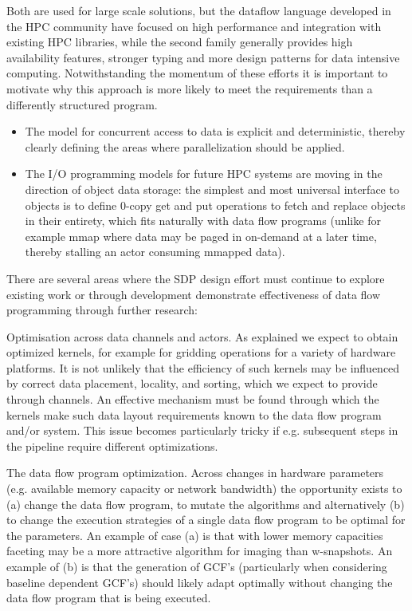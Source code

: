 \documentclass[11pt,a4paper]{article}
\begin{document}
Both are used for large scale solutions, but the dataflow language
developed in the HPC community have focused on high performance and
integration with existing HPC libraries, while the second family
generally provides high availability features, stronger typing and
more design patterns for data intensive computing.  Notwithstanding
the momentum of these efforts it is important to motivate why this
approach is more likely to meet the requirements than a differently
structured program.  
\begin{itemize}
\item The model for concurrent access to data is
explicit and deterministic, thereby clearly defining the areas where
parallelization should be applied.  
\item The I/O programming models for
future HPC systems are moving in the direction of object data storage:
the simplest and most universal interface to objects is to define
0-copy get and put operations to fetch and replace objects in their
entirety, which fits naturally with data flow programs (unlike for
example mmap where data may be paged in on-demand at a later time,
thereby stalling an actor consuming mmapped data).
\end{itemize}


There are several areas where the SDP design effort must continue to
explore existing work or through development demonstrate effectiveness
of data flow programming through further research:

Optimisation across data channels and actors.  As explained we expect
to obtain optimized kernels, for example for gridding operations for a
variety of hardware platforms.  It is not unlikely that the efficiency
of such kernels may be influenced by correct data placement, locality,
and sorting, which we expect to provide through channels.  An
effective mechanism must be found through which the kernels make such
data layout requirements known to the data flow program and/or
system. This issue becomes particularly tricky if e.g. subsequent
steps in the pipeline require different optimizations.

The data flow program optimization.  Across changes in hardware
parameters (e.g. available memory capacity or network bandwidth) the
opportunity exists to (a) change the data flow program, to mutate the
algorithms and alternatively (b) to change the execution strategies of
a single data flow program to be optimal for the parameters.  An
example of case (a) is that with lower memory capacities faceting may
be a more attractive algorithm for imaging than w-snapshots.  An
example of (b) is that the generation of GCF’s (particularly when
considering baseline dependent GCF’s) should likely adapt optimally
without changing the data flow program that is being executed.
\end{document}
